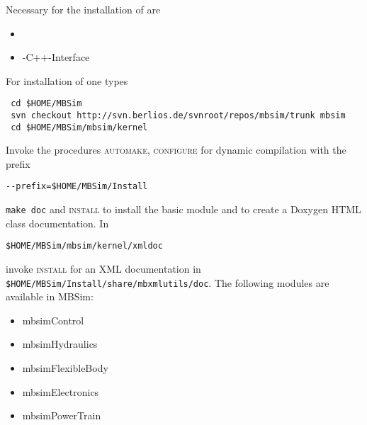 \subsubsection{\MBSim}
Necessary for the installation of \MBSim{} are
\begin{itemize}
\item \FMatVec{}
\item \OpenMBV{}-C++-Interface
\end{itemize}
For installation of \MBSim{} one types
\begin{verbatim}
 cd $HOME/MBSim
 svn checkout http://svn.berlios.de/svnroot/repos/mbsim/trunk mbsim
 cd $HOME/MBSim/mbsim/kernel
\end{verbatim}
Invoke the procedures \textsc{automake, configure} for dynamic compilation with the prefix
\begin{verbatim}
--prefix=$HOME/MBSim/Install
\end{verbatim}
\texttt{make doc} and \textsc{install} to install the basic module and to create a Doxygen HTML class documentation. In
\begin{verbatim}
$HOME/MBSim/mbsim/kernel/xmldoc
\end{verbatim}
invoke \textsc{install} for an XML documentation in \texttt{\$HOME/MBSim/Install/share/mbxmlutils/doc}.\vspace{5mm}
The following modules are available in MBSim:
\begin{itemize}
\item mbsimControl
\item mbsimHydraulics
\item mbsimFlexibleBody
\item mbsimElectronics
\item mbsimPowerTrain
\end{itemize}

